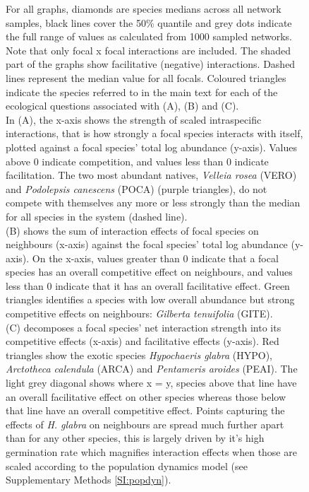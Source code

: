 \documentclass[a4,12pt]{article}
\begin{document}
    \addtocounter{figure}{-1}
    \begin{figure} [t!]
        \caption{For all graphs, diamonds are species medians across all network samples, black lines cover the 50\% quantile and grey dots indicate the full range of values as calculated from 1000 sampled networks. Note that only focal x focal interactions are included. The shaded part of the graphs show facilitative (negative) interactions. Dashed lines represent the median value for all focals. Coloured triangles indicate the species referred to in the main text for each of the ecological questions associated with (A), (B) and (C). \\
        In (A), the x-axis shows the strength of scaled intraspecific interactions, that is how strongly a focal species interacts with itself, plotted against a focal species' total log abundance (y-axis). Values above $0$ indicate competition, and values less than $0$ indicate facilitation.  The two most abundant natives, \textit{Velleia rosea} (VERO) and \textit{Podolepsis canescens} (POCA) (purple triangles), do not compete with themselves any more or less strongly than the median for all species in the system (dashed line). \\
        (B) shows the sum of interaction effects of focal species on neighbours (x-axis) against the focal species' total log abundance (y-axis). On the x-axis, values greater than $0$ indicate that a focal species has an overall competitive effect on neighbours, and values less than $0$ indicate that it has an overall facilitative effect. Green triangles identifies a species with low overall abundance but strong competitive effects on neighbours: \textit{Gilberta tenuifolia} (GITE). \\
        (C) decomposes a focal species' net interaction strength into its competitive effects (x-axis) and facilitative effects (y-axis). Red triangles show the exotic species \textit{Hypochaeris glabra} (HYPO), \textit{Arctotheca calendula} (ARCA) and \textit{Pentameris aroides} (PEAI). The light grey diagonal shows where x = y, species above that line have an overall facilitative effect on other species whereas those below that line have an overall competitive effect. Points capturing the effects of \textit{H. glabra} on neighbours are spread much further apart than for any other species, this is largely driven by it's high germination rate which magnifies interaction effects when those are scaled according to the population dynamics model (see Supplementary Methods \ref{SI:popdyn}).} 
    \end{figure}

\clearpage
\newpage



\end{document}
